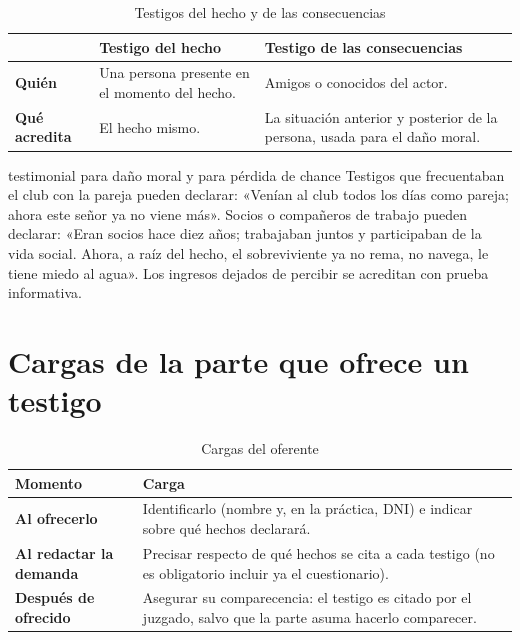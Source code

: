 \documentclass[12pt,oneside]{book}
\begin{document}
\begin{table}[H]
\centering
\caption{Testigos del hecho y de las consecuencias}
\begin{tabularx}{\textwidth}{>{\raggedright\arraybackslash\bfseries}p{} X X}
\toprule
 & Testigo del hecho & Testigo de las consecuencias \\
\midrule
Quién & Una persona presente en el momento del hecho. & Amigos o conocidos del actor. \\
Qué acredita & El hecho mismo. & La situación anterior y posterior de la persona, usada para el daño moral. \\
\bottomrule
\end{tabularx}
\end{table}

\begin{ejemplo}{testimonial para daño moral y para pérdida de chance}
Testigos que frecuentaban el club con la pareja pueden declarar: «Venían al club todos los días como pareja; ahora este señor ya no viene más». Socios o compañeros de trabajo pueden declarar: «Eran socios hace diez años; trabajaban juntos y participaban de la vida social. Ahora, a raíz del hecho, el sobreviviente ya no rema, no navega, le tiene miedo al agua». Los ingresos dejados de percibir se acreditan con prueba informativa.
\end{ejemplo}

\section{Cargas de la parte que ofrece un testigo}

\begin{table}[H]
\centering
\caption{Cargas del oferente}
\begin{tabularx}{\textwidth}{>{\raggedright\arraybackslash\bfseries}p{} X}
\toprule
Momento & Carga \\
\midrule
Al ofrecerlo & Identificarlo (nombre y, en la práctica, DNI) e indicar sobre qué hechos declarará. \\
Al redactar la demanda & Precisar respecto de qué hechos se cita a cada testigo (no es obligatorio incluir ya el cuestionario). \\
Después de ofrecido & Asegurar su comparecencia: el testigo es citado por el juzgado, salvo que la parte asuma hacerlo comparecer. \\
\bottomrule
\end{tabularx}
\end{table}
\end{document}
